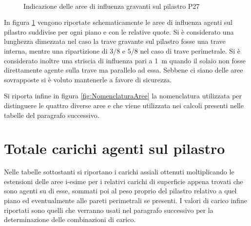\begin{figure}[htbp]
 \\
\caption{Indicazione delle aree di influenza gravanti sul pilastro P27}
\label{fig:AreeInfluenzaP27}
\end{figure}
In figura \ref{fig:AreeInfluenzaP27} vengono riportate schematicamente le aree di influenza agenti sul pilastro suddivise per ogni piano e con le relative quote. 
Si è considerato una lunghezza dimezzata nel caso la trave gravante sul pilastro fosse una trave interna, mentre una ripartizione di $3/8$ e $5/8$ nel caso di trave perimetrale. 
Si è considerato inoltre una striscia di influenza pari a \SI{1}{\meter} quando il solaio non fosse direttamente agente sulla trave ma parallelo ad essa. 
Sebbene ci siano delle aree sovrapposte si è voluto mantenerle a favore di sicurezza.

Si riporta infine in figura \ref{fig:NomenclaturaAree} la nomenclatura utilizzata per distinguere le quattro diverse aree e che viene utilizzata nei calcoli presenti nelle tabelle del paragrafo successivo.
\section{Totale carichi agenti sul pilastro}
Nelle tabelle sottostanti si riportano i carichi assiali ottenuti moltiplicando le estensioni delle aree i-esime per i relativi carichi di superficie appena trovati che sono agenti su di esse, sommati poi al peso proprio del pilastro relativo a quel piano ed eventualmente alle pareti perimetrali se presenti.
I valori di carico infine riportati sono quelli che verranno usati nel paragrafo successivo per la determinazione delle combinazioni di carico.
